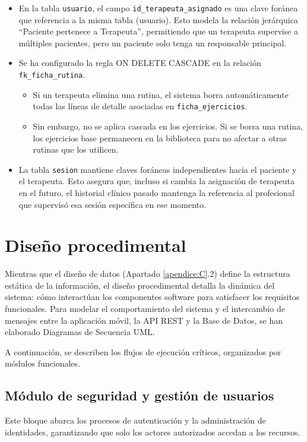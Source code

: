 \begin{itemize}
    \item En la tabla \texttt{usuario}, el campo \texttt{id\_terapeuta\_asignado} es una clave foránea que referencia a la misma tabla (usuario). Esto modela la relación jerárquica ``Paciente pertenece a Terapeuta'', permitiendo que un terapeuta supervise a múltiples pacientes, pero un paciente solo tenga un responsable principal.
    
    \item Se ha configurado la regla ON DELETE CASCADE en la relación \texttt{fk\_ficha\_rutina}.
    \begin{itemize}
        \item Si un terapeuta elimina una rutina, el sistema borra automáticamente todas las líneas de detalle asociadas en \texttt{ficha\_ejercicios}.
        \item Sin embargo, no se aplica cascada en los ejercicios. Si se borra una rutina, los ejercicios base permanecen en la biblioteca para no afectar a otras rutinas que los utilicen.
    \end{itemize}
    
    \item La tabla \texttt{sesion} mantiene claves foráneas independientes hacia el paciente y el terapeuta. Esto asegura que, incluso si cambia la asignación de terapeuta en el futuro, el historial clínico pasado mantenga la referencia al profesional que supervisó esa sesión específica en ese momento.
\end{itemize}
\section{Diseño procedimental}
Mientras que el diseño de datos (Apartado \ref{apendice:C}.2) define la estructura estática de la información, el diseño procedimental detalla la dinámica del sistema: cómo interactúan los componentes software para satisfacer los requisitos funcionales. Para modelar el comportamiento del sistema y el intercambio de mensajes entre la aplicación móvil, la API REST y la Base de Datos, se han elaborado Diagramas de Secuencia UML\cite{uml_spec}.

A continuación, se describen los flujos de ejecución críticos, organizados por módulos funcionales.

\subsection{Módulo de seguridad y gestión de usuarios}
Este bloque abarca los procesos de autenticación y la administración de identidades, garantizando que solo los actores autorizados accedan a los recursos.

